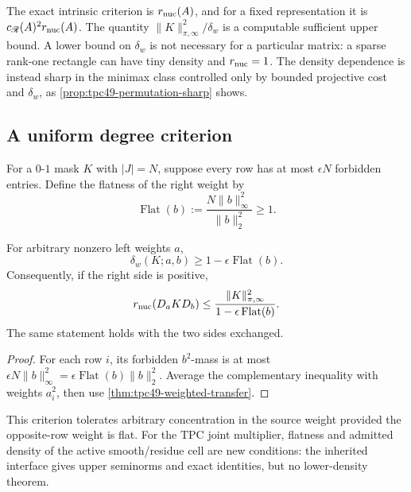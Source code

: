 \begin{remark}
\label{rem:tpc49-density-not-necessary}
The exact intrinsic criterion is \(r_{\rm nuc}(A)\), and for a fixed
representation it is
\(c_{\mathscr R}(A)^2r_{\rm nuc}(A)\).
The quantity \(\|K\|_{\pi,\infty}^2/\delta_w\) is a computable
sufficient upper bound.  A lower bound on \(\delta_w\) is not necessary
for a particular matrix: a sparse rank-one rectangle can have tiny
density and \(r_{\rm nuc}=1\).  The density dependence is instead sharp
in the minimax class controlled only by bounded projective cost and
\(\delta_w\), as \cref{prop:tpc49-permutation-sharp} shows.
\end{remark}

\subsection{A uniform degree criterion}

For a \(0\)-\(1\) mask \(K\) with \(|J|=N\), suppose every row has at
most \(\epsilon N\) forbidden entries.  Define the flatness of the
right weight by
\begin{equation}
 \operatorname{Flat}(b)
 :=\frac{N\|b\|_\infty^2}{\|b\|_2^2}\ge1.
 \label{eq:tpc49-weight-flatness}
\end{equation}

\begin{corollary}
\label{cor:tpc49-degree-flatness}
For arbitrary nonzero left weights \(a\),
\begin{equation}
 \delta_w(K;a,b)
 \ge1-\epsilon\operatorname{Flat}(b).
 \label{eq:tpc49-degree-density}
\end{equation}
Consequently, if the right side is positive,
\begin{equation}
 r_{\rm nuc}(D_aKD_b)
 \le\frac{\|K\|_{\pi,\infty}^2}
 {1-\epsilon\operatorname{Flat}(b)}.
 \label{eq:tpc49-degree-effective-rank}
\end{equation}
The same statement holds with the two sides exchanged.
\end{corollary}

\begin{proof}
For each row \(i\), its forbidden \(b^2\)-mass is at most
\(\epsilon N\|b\|_\infty^2
=\epsilon\operatorname{Flat}(b)\|b\|_2^2\).
Average the complementary inequality with weights \(a_i^2\), then use
\cref{thm:tpc49-weighted-transfer}.
\end{proof}

This criterion tolerates arbitrary concentration in the source weight
provided the opposite-row weight is flat.  For the TPC joint multiplier,
flatness and admitted density of the active smooth/residue cell are new
conditions: the inherited interface gives upper seminorms and exact
identities, but no lower-density theorem.

